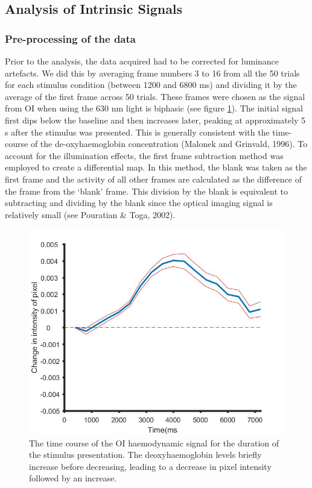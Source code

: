	\subsection{Analysis of Intrinsic Signals}
	
	\subsubsection{Pre-processing of the data}
	
	Prior to the analysis, the data acquired had to be corrected for luminance artefacts. We did this by averaging frame numbers 3 to 16 from all the 50 trials for each stimulus condition (between 1200 and 6800 ms) and dividing it by the average of the first frame across 50 trials. These frames were chosen as the signal from OI when using the 630 nm light is biphasic (see figure \ref{fig:oit}). The initial signal first dips below the baseline and then increases later, peaking at approximately 5 s after the stimulus was presented. This is generally consistent with the time-course of the de-oxyhaemoglobin concentration (Malonek and Grinvald, 1996). To account for the illumination effects, the first frame subtraction method was employed to create a differential map. In this method, the blank was taken as the first frame and the activity of all other frames are calculated as the difference of the frame from the ‘blank’ frame. This division by the blank is equivalent to subtracting and dividing by the blank since the optical imaging signal is relatively small (see Pouratian \& Toga, 2002).
	
		\begin{figure}[H]
		
		\includegraphics[width=\linewidth]{methods/OI_timecourse2.jpg}
		\caption{The time course of the OI haemodynamic signal for the duration of the stimulus presentation. The deoxyhaemoglobin levels briefly increase before decreasing, leading to a decrease in pixel intensity followed by an increase.}
		\label{fig:oit}
		\end{figure}
	
